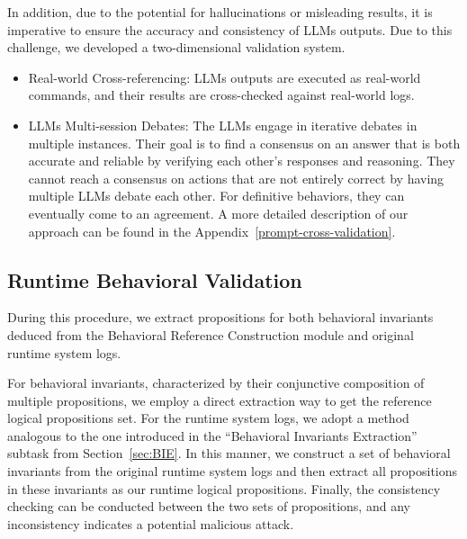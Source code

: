 In addition, due to the potential for hallucinations or misleading results, it is imperative to ensure the accuracy and consistency of LLMs outputs. Due to this challenge, we developed a two-dimensional validation system.
\begin{itemize}
    \item Real-world Cross-referencing: LLMs outputs are executed as real-world commands, and their results are cross-checked against real-world logs.
    \item LLMs Multi-session Debates: The LLMs engage in iterative debates in multiple instances. Their goal is to find a consensus on an answer that is both accurate and reliable by verifying each other's responses and reasoning. They cannot reach a consensus on actions that are not entirely correct by having multiple LLMs debate each other. For definitive behaviors, they can eventually come to an agreement. A more detailed description of our approach can be found in the Appendix~\ref{prompt-cross-validation}.
\end{itemize}

\subsection{Runtime Behavioral Validation}
During this procedure, we extract propositions for both behavioral invariants deduced from the Behavioral Reference Construction module and original runtime system logs.

For behavioral invariants, characterized by their conjunctive composition of multiple propositions, we employ a direct extraction way to get the reference logical propositions set. For the runtime system logs, we adopt a method analogous to the one introduced in the ``Behavioral Invariants Extraction'' subtask from Section~\ref{sec:BIE}. In this manner, we construct a set of behavioral invariants from the original runtime system logs and then extract all propositions in these invariants as our runtime logical propositions. Finally, the consistency checking can be conducted between the two sets of propositions, and any inconsistency indicates a potential malicious attack.

